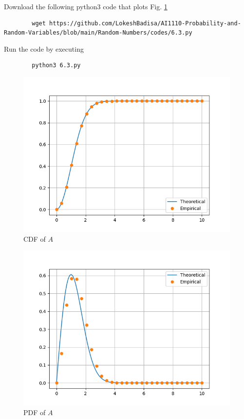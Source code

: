 \documentclass[journal,12pt,twocolumn]{IEEEtran}
\numberwithin{equation}{section}
\renewcommand\thesection{\arabic{section}}
\begin{document}
\begin{enumerate}[label=\thesection.\arabic*,ref=\thesection.\theenumi]
	Download the following python3 code that plots Fig. \ref{fig-6.3} 
	\begin{lstlisting}
		wget https://github.com/LokeshBadisa/AI1110-Probability-and-Random-Variables/blob/main/Random-Numbers/codes/6.3.py
	\end{lstlisting}
	Run the code by executing
	\begin{lstlisting}
		python3 6.3.py
	\end{lstlisting}
	\begin{figure}
		\centering
		\includegraphics[width=\columnwidth]{./figs/6.3.png}
		\caption{CDF of $A$}
		\label{fig-6.3}
	\end{figure}
	\begin{figure}
		\centering
		\includegraphics[width=\columnwidth]{./figs/6.4.png}
		\caption{PDF of $A$}
		\label{fig-6.4}
	\end{figure}
	

\end{enumerate}
\end{document}
